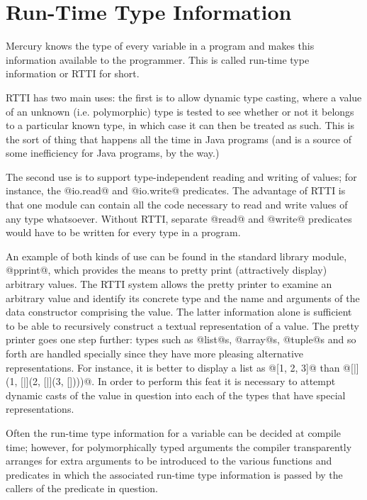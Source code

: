 


\chapter{Run-Time Type Information}

Mercury knows the type of every variable in a program and makes this
information available to the programmer.  This is called run-time type
information or RTTI for short.

RTTI has two main uses: the first is to allow dynamic type casting,
where a value of an unknown (i.e. polymorphic) type is tested to see
whether or not it belongs to a particular known type, in which case it
can then be treated as such.  This is the sort of thing that happens all
the time in Java programs (and is a source of some inefficiency
for Java programs, by the way.)

The second use is to support type-independent reading and writing of
values; for instance, the @io.read@ and @io.write@ predicates.  The
advantage of RTTI is that one module can contain all the code necessary
to read and write values of any type whatsoever.  Without RTTI, separate
@read@ and @write@ predicates would have to be written for every type in
a program.  

An example of both kinds of use can be found in the standard
library module, @pprint@, which provides the means to pretty print
(attractively display) arbitrary values.  The RTTI system allows the
pretty printer to examine an arbitrary value and identify its concrete
type and the name and arguments of the data constructor comprising the
value.  The latter information alone is sufficient to be able to
recursively construct a textual representation of a value.  The pretty
printer goes one step further: types such as @list@s, @array@s,
@tuple@s and so forth are handled specially since they have more
pleasing alternative representations.  For instance, it is better to
display a list as @[1, 2, 3]@ than @[|](1, [|](2, [|](3, [])))@.  In
order to perform this feat it is necessary to attempt dynamic casts of
the value in question into each of the types that have special
representations.

Often the run-time type information for a variable can be decided at
compile time; however, for polymorphically typed arguments the compiler
transparently arranges for extra arguments to be introduced to the
various functions and predicates in which the associated run-time type
information is passed by the callers of the predicate in question.

